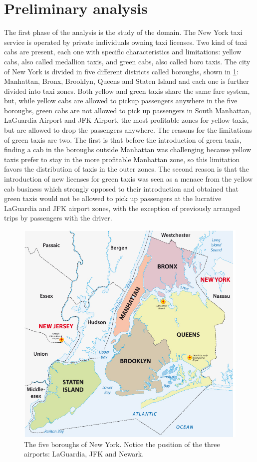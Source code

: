 \documentclass{acm_proc_article-sp-sigmod09}
\begin{document}
\section{Preliminary analysis}
\label{sec:preliminaryAnalysis}
The first phase of the analysis is the study of the domain. The New York taxi service is operated by private individuals owning taxi licenses. Two kind of taxi cabs are present, each one with specific characteristics and limitations: yellow cabs, also called medallion taxis, and green cabs, also called boro taxis. The city of New York is divided in five different districts called boroughs, shown in \cref{fig:boroughsMap}: Manhattan, Bronx, Brooklyn, Queens and Staten Island and each one is further divided into taxi zones. Both yellow and green taxis share the same fare system, but, while yellow cabs are allowed to pickup passengers anywhere in the five boroughs, green cabs are not allowed to pick up passengers in South Manhattan, LaGuardia Airport and JFK Airport, the most profitable zones for yellow taxis, but are allowed to drop the passengers anywhere. The reasons for the limitations of green taxis are two. The first is that before the introduction of green taxis, finding a cab in the boroughs outside Manhattan was challenging because yellow taxis prefer to stay in the more profitable Manhattan zone, so this limitation favors the distribution of taxis in the outer zones. The second reason is that the introduction of new licenses for green taxis was seen as a menace from the yellow cab business which strongly opposed to their introduction and obtained that green taxis would not be allowed to pick up passengers at the lucrative LaGuardia and JFK airport zones, with the exception of previously arranged trips by passengers with the driver.

\begin{figure}
	\centering
	\includegraphics{resources/boroughsMap.jpg}
	\caption{The five boroughs of New York. Notice the position of the three airports: LaGuardia, JFK and Newark.}
	\label{fig:boroughsMap}
\end{figure}
\end{document}
